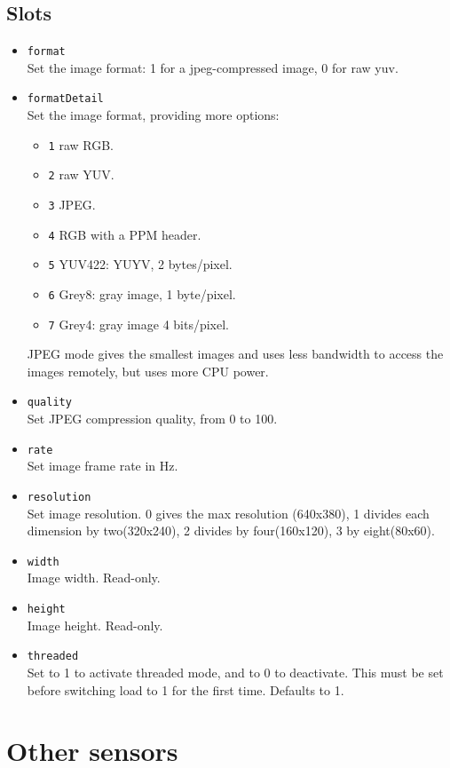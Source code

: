 \subsection{Slots}
\begin{itemize}
\item \lstinline|format| \\
  Set the image format: 1 for a jpeg-compressed image, 0 for raw yuv.
\item \lstinline|formatDetail| \\
  Set the image format, providing more options:
  \begin{itemize}
  \item \lstinline|1| raw RGB.
  \item \lstinline|2| raw YUV.
  \item \lstinline|3| JPEG.
  \item \lstinline|4| RGB with a PPM header.
  \item \lstinline|5| YUV422:  YUYV, 2 bytes/pixel.
  \item \lstinline|6| Grey8: gray image, 1 byte/pixel.
  \item \lstinline|7| Grey4: gray image 4 bits/pixel.
  \end{itemize}
  JPEG mode gives the smallest images and uses less bandwidth to access the
  images remotely, but uses more CPU power.
\item \lstinline|quality| \\
  Set JPEG compression quality, from 0 to 100.
\item \lstinline|rate| \\
  Set image frame rate in Hz.
\item \lstinline|resolution| \\
  Set image resolution.  0 gives the max resolution (640x380), 1 divides each
  dimension by two(320x240), 2 divides by four(160x120), 3 by eight(80x60).
\item \lstinline|width| \\
  Image width. Read-only.
\item \lstinline|height| \\
  Image height. Read-only.
\item \lstinline|threaded| \\
  Set to 1 to activate threaded mode, and to 0 to deactivate. This must be set
  before switching load to 1 for the first time. Defaults to 1.
\end{itemize}


\section{Other sensors}

